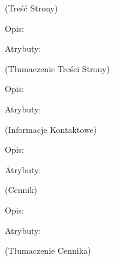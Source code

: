 \begin{enumerate}[label={\textbf{KAT/\protect\threedigits{\theenumi}}}, wide, labelwidth=!, labelindent=0pt, labelsep=0pt, series=reqs]
     \label{kat:SiteContent} (Treść Strony)

    Opis: \lipsum[1]
    \par
    Atrybuty:
    \begin{itemize}[series=atr]
         \label{kat:SiteContent:id}
         \label{kat:SiteContent:ordinalNumber}
         \label{kat:SiteContent:siteContentType}
         \label{kat:SiteContent:title}
         \label{kat:SiteContent:description}
    \end{itemize}

     \label{kat:SiteContentTranslation} (Tłumaczenie Treści Strony)

    Opis: \lipsum[1]
    \par
    Atrybuty:
    \begin{itemize}[series=atr]
         \label{kat:SiteContentTranslation:id}
         \label{kat:SiteContentTranslation:title}
         \label{kat:SiteContentTranslation:description}
         \label{kat:SiteContentTranslation:language}
    \end{itemize}

     \label{kat:ContactInfo} (Informacje Kontaktowe)

    Opis: \lipsum[1]
    \par
    Atrybuty:
    \begin{itemize}[series=atr]
         \label{kat:ContactInfo:id}
         \label{kat:ContactInfo:contactInfoType}
         \label{kat:ContactInfo:description}
    \end{itemize}

     \label{kat:Pricing} (Cennik)

    Opis: \lipsum[1]
    \par
    Atrybuty:
    \begin{itemize}[series=atr]
         \label{kat:Pricing:id}
         \label{kat:Pricing:ordinalNumber}
         \label{kat:Pricing:title}
         \label{kat:Pricing:description}
         \label{kat:Pricing:price}
         \label{kat:Pricing:currency}
    \end{itemize}

     \label{kat:PricingTranslation} (Tłumaczenie Cennika)


\end{enumerate}
